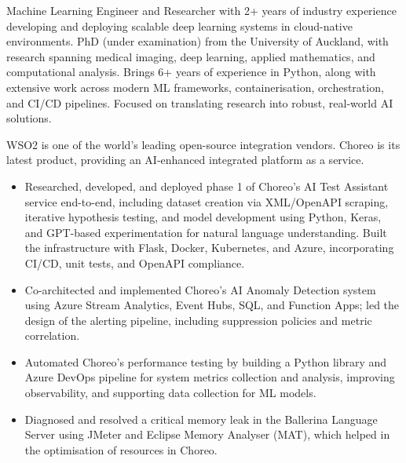 \documentclass[12pt,a4paper,withhyper]{altacv}
\begin{document}


\makecvheader{}

\medskip


Machine Learning Engineer and Researcher with 2+ years of industry experience developing and deploying scalable deep learning systems in cloud-native environments. PhD (under examination) from the University of Auckland, with research spanning medical imaging, deep learning, applied mathematics, and computational analysis. Brings 6+ years of experience in Python, along with extensive work across modern ML frameworks, containerisation, orchestration, and CI/CD pipelines. Focused on translating research into robust, real-world AI solutions.

\medskip


WSO2 is one of the world's leading open-source integration vendors. Choreo is its latest product, providing an AI-enhanced integrated platform as a service.
\medskip
\begin{itemize} 
    \item Researched, developed, and deployed phase 1 of Choreo’s AI Test Assistant service end-to-end, including dataset creation via XML/OpenAPI scraping, iterative hypothesis testing, and model development using Python, Keras, and GPT-based experimentation for natural language understanding. Built the infrastructure with Flask, Docker, Kubernetes, and Azure, incorporating CI/CD, unit tests, and OpenAPI compliance.
    \item Co-architected and implemented Choreo’s AI Anomaly Detection system using Azure Stream Analytics, Event Hubs, SQL, and Function Apps; led the design of the alerting pipeline, including suppression policies and metric correlation.
    \item Automated Choreo’s performance testing by building a Python library and Azure DevOps pipeline for system metrics collection and analysis, improving observability, and supporting data collection for ML models.
    \item Diagnosed and resolved a critical memory leak in the Ballerina Language Server using JMeter and Eclipse Memory Analyser (MAT), which helped in the optimisation of resources in Choreo.
\end{itemize}
\end{document}
